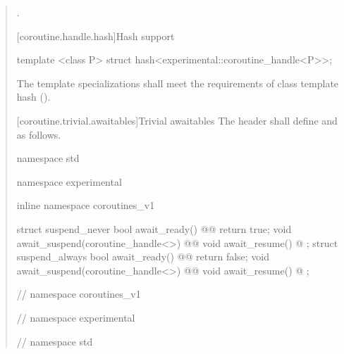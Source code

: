 \begin{quote}
\begin{itemdescr}
  \pnum
  \returns {}.
\end{itemdescr}

[coroutine.handle.hash]{Hash support}

\begin{itemdecl}
  template <class P> struct hash<experimental::coroutine_handle<P>>;
\end{itemdecl}

\begin{itemdescr}
  \pnum
The template specializations shall meet the requirements of class template hash ().
\end{itemdescr}

[coroutine.trivial.awaitables]{Trivial awaitables}
The header  shall define  and  as follows.
\begin{codeblock}
namespace std {
namespace experimental {
inline namespace coroutines_v1 {

  struct suspend_never {
    bool await_ready() @\cbstart{}@ { return true; }
    void await_suspend(coroutine_handle<>) @@ {}
    void await_resume() @\cbend@ {}
  };
  struct suspend_always {
    bool await_ready() @\cbstart{}@ { return false; }
    void await_suspend(coroutine_handle<>) @@ {}
    void await_resume() @\cbend@ {}
  };

} // namespace coroutines_v1
} // namespace experimental
} // namespace std
\end{codeblock}
\end{quote}

